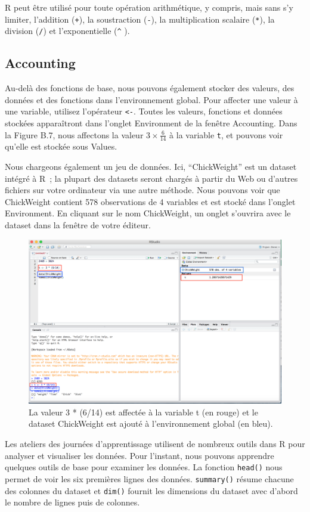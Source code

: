 \documentclass[12pt,]{book}
\begin{document}
R peut être utilisé pour toute opération arithmétique, y compris, mais sans s'y limiter, l'addition (\texttt{+}), la soustraction (\texttt{-}), la multiplication scalaire (\texttt{*}), la division (\texttt{/}) et l'exponentielle (\texttt{\^{}} ).

\hypertarget{accounting}{%
\subsection{Accounting}\label{accounting}}

Au-delà des fonctions de base, nous pouvons également stocker des valeurs, des données et des fonctions dans l'environnement global. Pour affecter une valeur à une variable, utilisez l'opérateur \texttt{\textless{}-}. Toutes les valeurs, fonctions et données stockées apparaîtront dans l'onglet Environment de la fenêtre Accounting. Dans la Figure B.7, nous affectons la valeur \(3 \times \frac{6}{14}\) à la variable \texttt{t}, et pouvons voir qu'elle est stockée sous Values.

Nous chargeons également un jeu de données. Ici, ``ChickWeight'' est un dataset intégré à R~; la plupart des datasets seront chargés à partir du Web ou d'autres fichiers sur votre ordinateur via une autre méthode. Nous pouvons voir que ChickWeight contient 578 observations de 4 variables et est stocké dans l'onglet Environment. En cliquant sur le nom ChickWeight, un onglet s'ouvrira avec le dataset dans la fenêtre de votre éditeur.

\begin{figure}
\includegraphics[width=0.6\linewidth]{Images/save_data} \caption{La valeur 3 * (6/14) est affectée à la variable t (en rouge) et le dataset ChickWeight est ajouté à l'environnement global (en bleu).}\label{fig:savedata}
\end{figure}

Les ateliers des journées d'apprentissage utilisent de nombreux outils dans R pour analyser et visualiser les données. Pour l'instant, nous pouvons apprendre quelques outils de base pour examiner les données. La fonction \texttt{head()} nous permet de voir les six premières lignes des données. \texttt{summary()} résume chacune des colonnes du dataset et \texttt{dim()} fournit les dimensions du dataset avec d'abord le nombre de lignes puis de colonnes.
\end{document}
